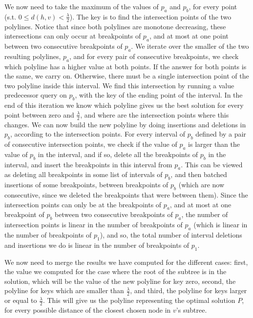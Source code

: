 \documentclass[11pt,a4paper]{article}
\theoremstyle{definition}
\theoremstyle{remark}
\begin{document}
We now need to take the maximum of the values of $p_a$ and $p_b$, for every point (s.t. $0 \leq d(h,v) < \frac{\lambda}{2}$). The key is to find the intersection points of the two polylines. Notice that since both polylines are monotone decreasing, these intersections can only occur at breakpoints of $p_a$, and at most at one point between two consecutive breakpoints of $p_a$. We iterate over the smaller of the two resulting polylines, $p_a$, and for every pair of consecutive breakpoints, we check which polyline has a higher value at both points. If the answer for both points is the same, we carry on. Otherwise, there must be a single intersection point of the two polyline inside this interval. We find this intersection by running a value predecessor query on $p_b$, with the key of the ending point of the interval. In the end of this iteration we know which polyline gives us the best solution for every point between zero and $\frac{\lambda}{2}$, and where are the intersection points where this changes. We can now build the new polyline by doing insertions and deletions in $p_b$, according to the intersection points. For every interval of $p_b$ defined by a pair of consecutive intersection points, we check if the value of $p_a$ is larger than the value of $p_b$ in the interval, and if so, delete all the breakpoints of $p_b$ in the interval, and insert the breakpoints in this interval from $p_a$. This can be viewed as deleting all breakpoints in some list of intervals of $p_b$, and then batched insertions of some breakpoints, between breakpoints of $p_b$ (which are now consecutive, since we deleted the breakpoints that were between them). Since the intersection points can only be at the breakpoints of $p_a$, and at most at one breakpoint of $p_b$ between two consecutive breakpoints of $p_a$, the number of intersection points is linear in the number of breakpoints of $p_a$ (which is linear in the number of breakpoints of $p_1$), and so, the total number of interval deletions and insertions we do is linear in the number of breakpoints of $p_1$.

We now need to merge the results we have computed for the different cases: first, the value we computed for the case where the root of the subtree is in the solution, which will be the value of the new polyline for key zero, second, the polyline for keys which are smaller than $\frac{\lambda}{2}$, and third, the polyline for keys larger or equal to $\frac{\lambda}{2}$. This will give us the polyline representing the optimal solution $P$, for every possible distance of the closest chosen node in $v$'s subtree.
\end{document}
